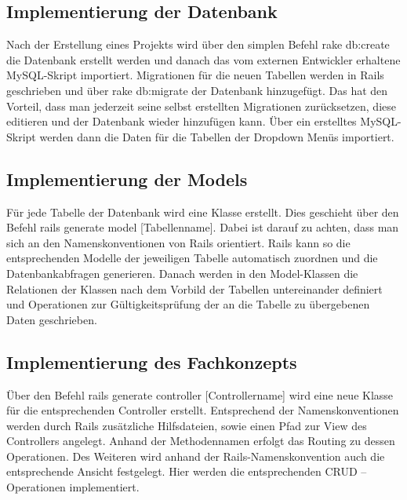 \subsection{Implementierung der Datenbank}
\label{subsec:ImplementierungGeschäftslogik}
Nach der Erstellung eines Projekts wird über den simplen Befehl rake db:create 
die Datenbank erstellt werden und danach das vom externen Entwickler erhaltene MySQL-Skript importiert. Migrationen für die neuen Tabellen werden in Rails geschrieben und über rake db:migrate der Datenbank hinzugefügt. Das hat den Vorteil, dass man jederzeit seine selbst erstellten Migrationen zurücksetzen, diese editieren und der Datenbank wieder hinzufügen kann. Über ein erstelltes MySQL-Skript werden dann die Daten für die Tabellen der Dropdown Menüs importiert.

\subsection{Implementierung der Models}
Für jede Tabelle der Datenbank wird eine Klasse erstellt. Dies geschieht über den Befehl rails generate model [Tabellenname]. Dabei ist darauf zu achten, dass man sich an den Namenskonventionen von Rails orientiert. Rails kann so die entsprechenden Modelle der jeweiligen Tabelle automatisch zuordnen und die Datenbankabfragen generieren. Danach werden in den Model-Klassen die Relationen der Klassen nach dem Vorbild der Tabellen untereinander definiert und Operationen zur Gültigkeitsprüfung der an die Tabelle zu übergebenen Daten geschrieben.

\subsection{Implementierung des Fachkonzepts}
Über den Befehl rails generate controller [Controllername] wird eine neue Klasse für die entsprechenden Controller erstellt. Entsprechend der Namenskonventionen werden durch Rails zusätzliche Hilfsdateien, sowie einen Pfad zur View des Controllers angelegt. Anhand der Methodennamen erfolgt das Routing zu dessen Operationen. Des Weiteren wird anhand der Rails-Namenskonvention auch die entsprechende Ansicht festgelegt. Hier werden die entsprechenden CRUD – Operationen implementiert. 

